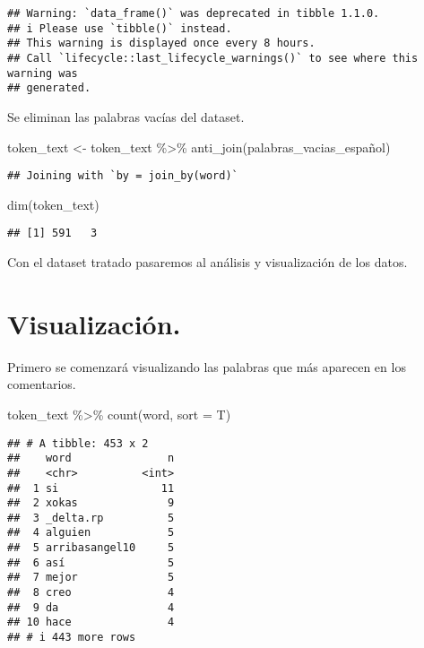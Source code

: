 \documentclass[
]{article}
\newenvironment{Shaded}{\begin{snugshade}}{\end{snugshade}}
\newcommand{\AttributeTok}[1]{\textcolor[rgb]{0.77,0.63,0.00}{#1}}
\newcommand{\FunctionTok}[1]{\textcolor[rgb]{0.00,0.00,0.00}{#1}}
\newcommand{\NormalTok}[1]{#1}
\newcommand{\OtherTok}[1]{\textcolor[rgb]{0.56,0.35,0.01}{#1}}
\newcommand{\SpecialCharTok}[1]{\textcolor[rgb]{0.00,0.00,0.00}{#1}}
\begin{document}
\begin{verbatim}
## Warning: `data_frame()` was deprecated in tibble 1.1.0.
## i Please use `tibble()` instead.
## This warning is displayed once every 8 hours.
## Call `lifecycle::last_lifecycle_warnings()` to see where this warning was
## generated.
\end{verbatim}

Se eliminan las palabras vacías del dataset.

\begin{Shaded}
\begin{Highlighting}[]
\NormalTok{token\_text }\OtherTok{\textless{}{-}}\NormalTok{ token\_text }\SpecialCharTok{\%\textgreater{}\%} 
  \FunctionTok{anti\_join}\NormalTok{(palabras\_vacias\_español)}
\end{Highlighting}
\end{Shaded}

\begin{verbatim}
## Joining with `by = join_by(word)`
\end{verbatim}

\begin{Shaded}
\begin{Highlighting}[]
\FunctionTok{dim}\NormalTok{(token\_text)}
\end{Highlighting}
\end{Shaded}

\begin{verbatim}
## [1] 591   3
\end{verbatim}

Con el dataset tratado pasaremos al análisis y visualización de los
datos.

\hypertarget{visualizaciuxf3n.}{%
\section{Visualización.}\label{visualizaciuxf3n.}}

Primero se comenzará visualizando las palabras que más aparecen en los
comentarios.

\begin{Shaded}
\begin{Highlighting}[]
\NormalTok{token\_text }\SpecialCharTok{\%\textgreater{}\%} \FunctionTok{count}\NormalTok{(word, }\AttributeTok{sort =}\NormalTok{ T)}
\end{Highlighting}
\end{Shaded}

\begin{verbatim}
## # A tibble: 453 x 2
##    word               n
##    <chr>          <int>
##  1 si                11
##  2 xokas              9
##  3 _delta.rp          5
##  4 alguien            5
##  5 arribasangel10     5
##  6 así                5
##  7 mejor              5
##  8 creo               4
##  9 da                 4
## 10 hace               4
## # i 443 more rows
\end{verbatim}
\end{document}
